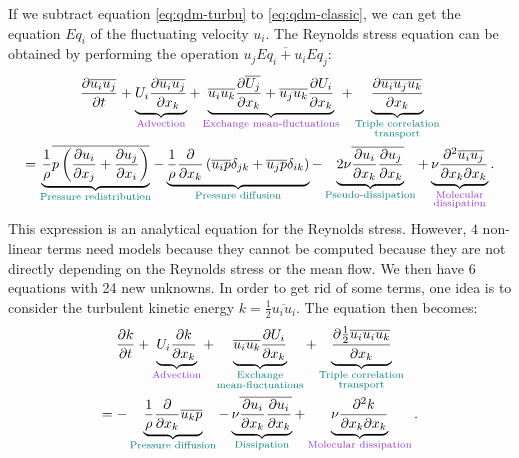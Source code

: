 If we subtract  equation \ref{eq:qdm-turbu} to \ref{eq:qdm-classic}, we can get the equation $Eq_i$ of the fluctuating velocity $u_i$. The Reynolds stress equation can be obtained by performing the operation $\overline{u_jEq_i+u_iEq_j}$:
 \begin{multline}
     \frac{\partial \overline{u_iu_j}}{\partial t}  +\underbrace{U_i\frac{\partial \overline{u_iu_j}}{\partial x_k}}_{\color{mydarkorchid}\text{Advection}} + \underbrace{\overline{u_iu_k}\frac{\partial \overline{U_j}}{\partial x_k} + \overline{u_ju_k}\frac{\partial U_i}{\partial x_k}}_{\color{mydarkorchid}\text{Exchange mean-fluctuations}} + \underbrace{\frac{\partial \overline{u_iu_ju_k}}{\partial x_k}}_{\color{myteal}\substack{\text{Triple correlation}\\\text{transport}}} \\  = \underbrace{\frac{1}{\rho} \overline{p\parent{\frac{\partial u_i}{\partial x_j}      + \frac{\partial u_j}{\partial x_i}}}}_{\color{myteal}\text{Pressure redistribution}} 
     - \underbrace{\frac{1}{\rho}\frac{\partial}{\partial x_k}\parent{\overline{u_ip}\delta_{jk} + \overline{u_jp}\delta_{ik}}}_{\color{myteal}\text{Pressure diffusion}} 
     - \underbrace{2\nu\overline{\frac{\partial u_i}{\partial x_k}\frac{\partial u_j}{\partial x_k}}}_{\color{myteal}\text{Pseudo-dissipation}} 
     + \underbrace{\nu \frac{\partial^2 \overline{u_iu_j}}{\partial x_k \partial x_k}}_{\color{mydarkorchid}\substack{\text{Molecular}\\\text{dissipation}}}.
\end{multline}
This expression is an analytical equation for the Reynolds stress. However, $4$ non-linear terms need models because they cannot be computed because they are not directly depending on the Reynolds stress or the mean flow. We then have 6 equations with 24 new unknowns. In order to get rid of some terms, one idea is to consider the turbulent kinetic energy $k=\frac{1}{2}\overline{u_iu_i}$. The equation then becomes:
\begin{multline}
    \frac{\partial k}{\partial t} +\underbrace{U_i\frac{\partial k}{\partial x_k}}_{\color{mydarkorchid}\text{Advection}} + \underbrace{\overline{u_iu_k}\frac{\partial U_i}{\partial x_k}}_{\color{myteal}\substack{\text{Exchange}\\\text{mean-fluctuations}}} + \underbrace{\frac{\partial \frac{1}{2} \overline{u_iu_iu_k}}{\partial x_k}}_{\color{myteal}\substack{\text{Triple correlation}\\\text{transport}}} \\ =-\underbrace{\frac{1}{\rho}\frac{\partial}{\partial x_k}\overline{u_kp}}_{\color{myteal}\text{Pressure diffusion}}  -\underbrace{\nu\overline{\frac{\partial u_i}{\partial x_k}\frac{\partial u_i}{\partial x_k}}}_{\color{myteal}\text{Dissipation}} + \underbrace{\nu \frac{\partial^2 k}{\partial x_k \partial x_k}}_{\color{mydarkorchid} \text{Molecular dissipation}}.
\end{multline}
